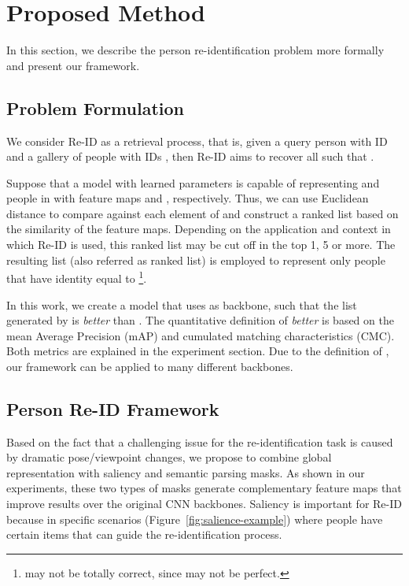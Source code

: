 \documentclass[final,3p,times,twocolumn]{elsarticle}
\begin{document}
 \section{Proposed Method}
\label{sec:method}

In this section, we describe the person re-identification problem more formally and present our framework.

\subsection{Problem Formulation}

We consider Re-ID as a retrieval process, that is, given a query person  with ID  and a gallery of  people  with IDs , then Re-ID aims to recover all  such that .

Suppose that a model  with learned parameters  is capable of representing  and people in  with feature maps  and , respectively. Thus, we can use Euclidean distance to compare  against each element of  and construct a ranked list based on the similarity of the feature maps. Depending on the application and context in which Re-ID is used, this ranked list may be cut off in the top 1, 5 or more. The resulting list  (also referred as ranked list) is employed to represent only people that have identity equal to \footnote{ may not be totally correct, since  may not be perfect.}.

In this work, we create a model  that uses  as backbone, such that the list  generated by  is \textit{better} than . The quantitative definition of \textit{better} is based on the mean Average Precision (mAP) and cumulated matching characteristics (CMC). Both metrics are explained in the experiment section. Due to the definition of , our framework can be applied to many different backbones.

\subsection{Person Re-ID Framework}

Based on the fact that a challenging issue for the re-identification task is caused by dramatic pose/viewpoint changes, we propose to combine global representation with saliency and semantic parsing masks. As shown in our experiments, these two types of masks generate complementary feature maps that improve results over the original CNN backbones. Saliency is important for Re-ID because in specific scenarios (Figure~\ref{fig:salience-example}) where people have certain items that can guide the re-identification process.
\end{document}
